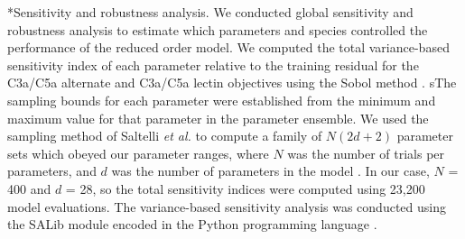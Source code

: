 \documentclass[12pt]{article}
\makeatletter
\renewcommand\subsection{\@startsection
	{subsection}{2}{0mm}
	{-0.05in}
	{-0.5\baselineskip}
	{\normalfont\normalsize\bfseries}}
\makeatother
\begin{document}

\subsection*{Sensitivity and robustness analysis.}
We conducted global sensitivity and robustness analysis to estimate which parameters and species controlled the performance of the reduced order model.
We computed the total variance-based sensitivity index of each parameter relative to the training residual for the C3a/C5a alternate and C3a/C5a lectin objectives
using the Sobol method \cite{SOBOL_METHOD}.
sThe sampling bounds for each parameter were established from the minimum and maximum value for that parameter in the parameter ensemble.
We used the sampling method of Saltelli \textit{et al.} to compute a family of $N\left(2d+2\right)$ parameter sets which obeyed our parameter ranges,
where $N$ was the number of trials per parameters, and $d$ was the number of parameters in the model \cite{saltelli2010variance}.
In our case, $N$ = 400 and $d$ = 28, so the total sensitivity indices were computed using 23,200 model evaluations.
The variance-based sensitivity analysis was conducted using the SALib module encoded in the Python programming language \cite{SALIB}.
\end{document}
